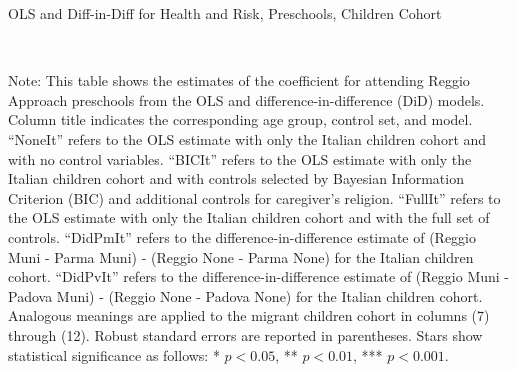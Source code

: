 \begin{landscape}

\begin{table}[H] \caption{OLS and Diff-in-Diff for Health and Risk, Preschools, Children Cohort} \label{ols-W-reg}
\scalebox{0.76}{
}
\vspace{1ex} \\
\footnotesize\raggedright{Note: This table shows the estimates of the coefficient for attending Reggio Approach preschools from the OLS and difference-in-difference (DiD) models. Column title indicates the corresponding age group, control set, and model. ``NoneIt'' refers to the OLS estimate with only the Italian children cohort and with no control variables. ``BICIt'' refers to the OLS estimate with only the Italian children cohort and with controls selected by Bayesian Information Criterion (BIC) and additional controls for caregiver's religion. ``FullIt'' refers to the OLS estimate with only the Italian children cohort and with the full set of controls. ``DidPmIt'' refers to the difference-in-difference estimate of (Reggio Muni - Parma Muni) - (Reggio None - Parma None) for the Italian children cohort. ``DidPvIt'' refers to the difference-in-difference estimate of (Reggio Muni - Padova Muni) - (Reggio None - Padova None) for the Italian children cohort.  Analogous meanings are applied to the migrant children cohort in columns (7) through (12). Robust standard errors are reported in parentheses. Stars show statistical significance as follows: * $p < 0.05$, ** $p < 0.01$, *** $p < 0.001$.}
\end{table}



\end{landscape}
